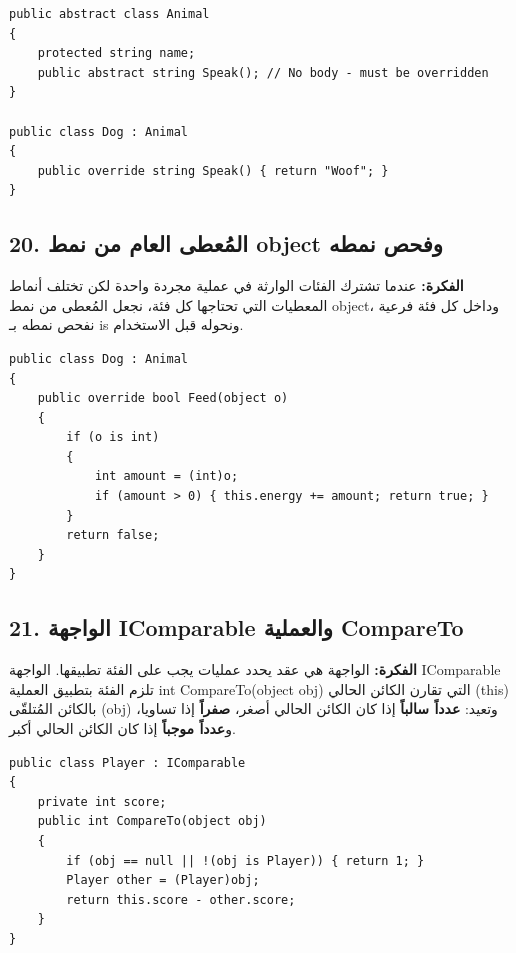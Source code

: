 \documentclass[14pt]{extarticle}
\begin{document}
\begin{boxCode}
\begin{english}
\begin{verbatim}
public abstract class Animal
{
    protected string name;
    public abstract string Speak(); // No body - must be overridden
}

public class Dog : Animal
{
    public override string Speak() { return "Woof"; }
}
\end{verbatim}
\end{english}
\end{boxCode}

\filbreak
\subsection*{20. المُعطى العام من نمط \textenglish{object} وفحص نمطه}
\textbf{الفكرة:} عندما تشترك الفئات الوارثة في عملية مجردة واحدة لكن تختلف أنماط المعطيات التي تحتاجها كل فئة، نجعل المُعطى من نمط \textenglish{object}، وداخل كل فئة فرعية نفحص نمطه بـ \textenglish{is} ونحوله قبل الاستخدام.

\begin{boxCode}
\begin{english}
\begin{verbatim}
public class Dog : Animal
{
    public override bool Feed(object o)
    {
        if (o is int)
        {
            int amount = (int)o;
            if (amount > 0) { this.energy += amount; return true; }
        }
        return false;
    }
}
\end{verbatim}
\end{english}
\end{boxCode}

\filbreak
\subsection*{21. الواجهة \textenglish{IComparable} والعملية \textenglish{CompareTo}}
\textbf{الفكرة:} الواجهة هي عقد يحدد عمليات يجب على الفئة تطبيقها. الواجهة \textenglish{IComparable} تلزم الفئة بتطبيق العملية \textenglish{int CompareTo(object obj)} التي تقارن الكائن الحالي (\textenglish{this}) بالكائن المُتلقّى (\textenglish{obj}) وتعيد: \textbf{عدداً سالباً} إذا كان الكائن الحالي أصغر، \textbf{صفراً} إذا تساويا، و\textbf{عدداً موجباً} إذا كان الكائن الحالي أكبر.

\begin{boxCode}
\begin{english}
\begin{verbatim}
public class Player : IComparable
{
    private int score;
    public int CompareTo(object obj)
    {
        if (obj == null || !(obj is Player)) { return 1; }
        Player other = (Player)obj;
        return this.score - other.score;
    }
}
\end{verbatim}
\end{english}
\end{boxCode}
\end{document}

